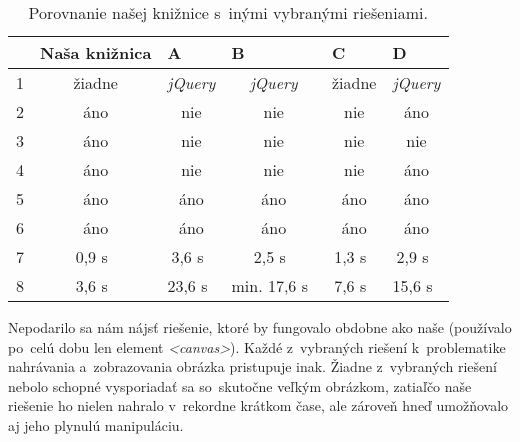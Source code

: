 \begin{table}[!htb]
	\centering
	\begin{tabular}{@{}|l|c|c|c|c|c|@{}}
	\toprule
		  		   & \multicolumn{1}{l|}{Naša knižnica} & \multicolumn{1}{l|}{A} & \multicolumn{1}{l|}{B} & \multicolumn{1}{l|}{C} & \multicolumn{1}{l|}{D} \\ \midrule
	1              & žiadne                & \emph{jQuery}          & \emph{jQuery}          & žiadne                 & \emph{jQuery}          \\ \midrule
	2 		       & áno                   & nie                    & nie                    & nie                    & áno                    \\ \midrule
	3  			   & áno                   & nie                    & nie                    & nie                    & nie                    \\ \midrule
	4			   & áno                   & nie                    & nie                    & nie                    & áno                    \\ \midrule
	5		       & áno                   & áno                    & áno                    & áno                    & áno                    \\ \midrule
	6              & áno                   & áno                    & áno                    & áno                    & áno                    \\ \midrule
	7 			   & 0,9 s~                & 3,6 s~                 & 2,5 s~                 & 1,3 s~                 & 2,9 s~                 \\ \midrule
	8   		   & 3,6 s~                & 23,6 s~                & min. 17,6 s~			 & 7,6 s~                 & 15,6 s~                \\ \bottomrule
	\end{tabular}
	\caption{Porovnanie našej knižnice s~inými vybranými riešeniami.}
	\label{my-label}
\end{table}

Nepodarilo sa nám nájsť riešenie, ktoré by fungovalo obdobne ako naše (používalo po~celú dobu len element \emph{<canvas>}). Každé z~vybraných riešení k~problematike nahrávania a~zobrazovania obrázka pristupuje inak. Žiadne z~vybraných riešení nebolo schopné vysporiadať sa so~skutočne veľkým obrázkom, zatiaľčo naše riešenie ho nielen nahralo v~rekordne krátkom čase, ale zároveň hneď umožňovalo aj jeho plynulú manipuláciu.